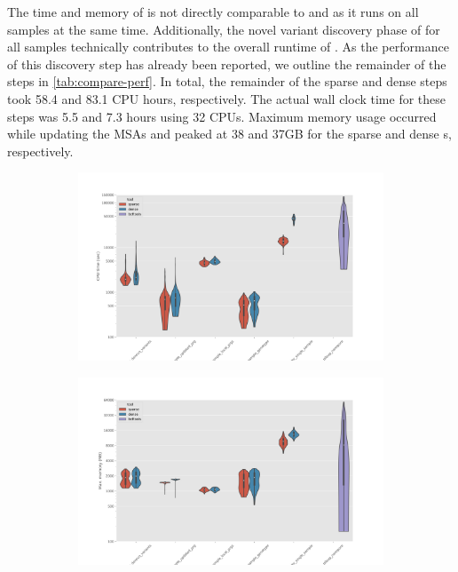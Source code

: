 The time and memory of \compare{} is not directly comparable to \bcftools{} and \pandora{}  as it runs on all samples at the same time. Additionally, the novel variant discovery phase of \pandora{}  for all samples technically contributes to the overall runtime of \compare{}. As the performance of this discovery step has already been reported, we outline the remainder of the \compare{} steps in \autoref{tab:compare-perf}. In total, the remainder of the sparse and dense \prg{} steps took 58.4 and 83.1 CPU hours, respectively. The actual wall clock time for these steps was 5.5 and 7.3 hours using 32 CPUs. Maximum memory usage occurred while updating the MSAs and peaked at 38 and 37GB for the sparse and dense \prg{}s, respectively.

\begin{figure}
     \centering
     \begin{subfigure}[b]{0.475\textwidth}
         \centering
         \includegraphics[width=\textwidth]{Chapter2/Figs/cpu_time.png}
         \caption{}
         \label{fig:cpu-time}
     \end{subfigure}
     \begin{subfigure}[b]{0.475\textwidth}
         \centering
         \includegraphics[width=\textwidth]{Chapter2/Figs/max_mem.png}

\end{subfigure}
\end{figure}
